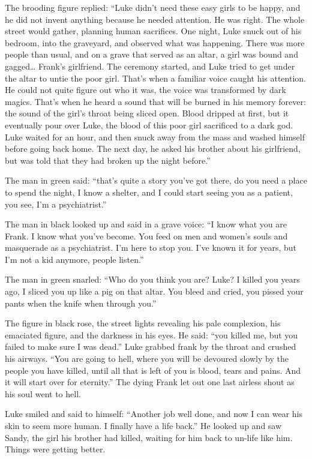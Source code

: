 The brooding figure replied: ``Luke didn't need these
easy girls to be happy, and he did not invent anything because he
needed attention. He was right. The whole street would gather,
planning human sacrifices. One night, Luke snuck out of his
bedroom, into the graveyard, and observed what was happening. There
was more people than usual, and on a grave that served as an altar,
a girl was bound and gagged{\ldots} Frank's girlfriend. The
ceremony started, and Luke tried to get under the altar to untie
the poor girl. That's when a familiar voice caught his
attention. He could not quite figure out who it was, the voice was
transformed by dark magics. That's when he heard a sound that
will be burned in his memory forever: the sound of the girl's
throat being sliced open. Blood dripped at first, but it eventually
pour over Luke, the blood of this poor girl sacrificed to a dark
god. Luke waited for an hour, and then snuck away from the mass and
washed himself before going back home. The next day, he asked his
brother about his girlfriend, but was told that they had broken up
the night before.''

The man in green said: ``that's quite a story
you've got there, do you need a place to spend the night, I
know a shelter, and I could start seeing you as a patient, you see,
I'm a psychiatrist.''

The man in black looked up and said in a grave voice: ``I know
what you are Frank. I know what you've become. You feed on
men and women's souls and masquerade as a psychiatrist.
I'm here to stop you. I've known it for years, but
I'm not a kid anymore, people listen.''

The man in green snarled: ``Who do you think you are? Luke? I
killed you years ago, I sliced you up like a pig on that altar. You
bleed and cried, you pissed your pants when the knife when through
you.''

The figure in black rose, the street lights revealing his pale
complexion, his emaciated figure, and the darkness in his eyes. He
said: ``you killed me, but you failed to make sure I was
dead.'' Luke grabbed frank by the throat and crushed his
airways. ``You are going to hell, where you will be devoured
slowly by the people you have killed, until all that is left of you
is blood, tears and pains. And it will start over for
eternity.'' The dying Frank let out one last airless shout as
his soul went to hell.

Luke smiled and said to himself: ``Another job well done, and
now I can wear his skin to seem more human. I finally have a life
back.'' He looked up and saw Sandy, the girl his brother had
killed, waiting for him back to un-life like him. Things were
getting better.


